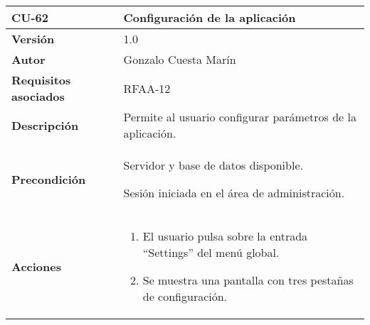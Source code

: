 \begin{longtable}[]{@{}ll@{}}
\toprule
\begin{minipage}[b]{0.21\columnwidth}\raggedright
\textbf{CU-62}\strut
\end{minipage} & \begin{minipage}[b]{0.73\columnwidth}\raggedright
\textbf{Configuración de la aplicación}\strut
\end{minipage}\tabularnewline
\midrule
\endhead
\begin{minipage}[t]{0.21\columnwidth}\raggedright
\textbf{Versión}\strut
\end{minipage} & \begin{minipage}[t]{0.73\columnwidth}\raggedright
1.0\strut
\end{minipage}\tabularnewline
\begin{minipage}[t]{0.21\columnwidth}\raggedright
\textbf{Autor}\strut
\end{minipage} & \begin{minipage}[t]{0.73\columnwidth}\raggedright
Gonzalo Cuesta Marín\strut
\end{minipage}\tabularnewline
\begin{minipage}[t]{0.21\columnwidth}\raggedright
\textbf{Requisitos asociados}\strut
\end{minipage} & \begin{minipage}[t]{0.73\columnwidth}\raggedright
RFAA-12\strut
\end{minipage}\tabularnewline
\begin{minipage}[t]{0.21\columnwidth}\raggedright
\textbf{Descripción}\strut
\end{minipage} & \begin{minipage}[t]{0.73\columnwidth}\raggedright
Permite al usuario configurar parámetros de la aplicación.\strut
\end{minipage}\tabularnewline
\begin{minipage}[t]{0.21\columnwidth}\raggedright
\textbf{Precondición}\strut
\end{minipage} & \begin{minipage}[t]{0.73\columnwidth}\raggedright
Servidor y base de datos disponible.

Sesión iniciada en el área de administración.\strut
\end{minipage}\tabularnewline
\begin{minipage}[t]{0.21\columnwidth}\raggedright
\textbf{Acciones}\strut
\end{minipage} & \begin{minipage}[t]{0.73\columnwidth}\raggedright
\begin{enumerate}
\def\labelenumi{\arabic{enumi}.}
\tightlist
\item
  El usuario pulsa sobre la entrada ``Settings'' del menú global.
\item
  Se muestra una pantalla con tres pestañas de configuración.


\end{enumerate}
\end{minipage}
\end{longtable}
